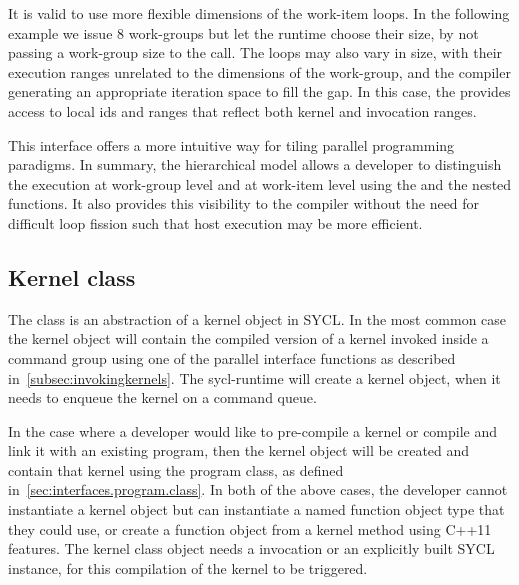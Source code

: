 It is valid to use more flexible dimensions of the work-item loops. In
the following example we issue 8 work-groups but let the runtime
choose their size, by not passing a work-group size to the
 call. The
 loops may also vary in size, with
their execution ranges unrelated to the dimensions of the work-group,
and the compiler generating an appropriate iteration space to fill the
gap. In this case, the  provides access to local ids and
ranges that reflect both kernel and  invocation ranges.



This interface offers a more intuitive way for tiling parallel
programming paradigms. In summary, the hierarchical model allows a
developer to distinguish the execution at work-group level and at
work-item level using the  and the nested
 functions. It also provides this visibility
to the compiler without the need for difficult loop fission such that
host execution may be more efficient.




\subsection{Kernel class}
\label{subsec:kernel.class}

The  class is an abstraction of a \gls{kernel} object
in SYCL. In the
most common case the kernel object will contain the compiled version of a kernel
invoked inside a command group using one of the parallel interface functions as
described in~\ref{subsec:invokingkernels}. The \gls{sycl-runtime} will create
a kernel object, when it needs to enqueue the kernel on a command queue.

In the case where a developer would like to pre-compile a kernel or compile and
link it with an existing program, then the kernel object will be created and
contain that kernel using the program class, as defined
in~\ref{sec:interfaces.program.class}. In both of the above cases, the developer
cannot instantiate a kernel object but can instantiate a named function object type
that they could use, or create a function object from a kernel method using C++11 features.
The kernel class object needs a  invocation or an
explicitly built SYCL  instance, for this compilation of the kernel to be triggered.


